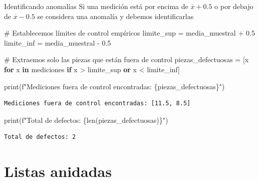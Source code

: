 \documentclass[
  ignorenonframetext,
  aspectratio=169,
  spanish,
]{beamer}
\newenvironment{Shaded}{\begin{snugshade}}{\end{snugshade}}
\newcommand{\BuiltInTok}[1]{\textcolor[rgb]{0.00,0.23,0.31}{#1}}
\newcommand{\CommentTok}[1]{\textcolor[rgb]{0.37,0.37,0.37}{#1}}
\newcommand{\ControlFlowTok}[1]{\textcolor[rgb]{0.00,0.23,0.31}{\textbf{#1}}}
\newcommand{\FloatTok}[1]{\textcolor[rgb]{0.68,0.00,0.00}{#1}}
\newcommand{\KeywordTok}[1]{\textcolor[rgb]{0.00,0.23,0.31}{\textbf{#1}}}
\newcommand{\NormalTok}[1]{\textcolor[rgb]{0.00,0.23,0.31}{#1}}
\newcommand{\OperatorTok}[1]{\textcolor[rgb]{0.37,0.37,0.37}{#1}}
\newcommand{\SpecialCharTok}[1]{\textcolor[rgb]{0.37,0.37,0.37}{#1}}
\newcommand{\SpecialStringTok}[1]{\textcolor[rgb]{0.13,0.47,0.30}{#1}}
\begin{document}
\begin{frame}[fragile]{Identificando anomalías}
\label{identificando-anomaluxedas}
Si una medición está por encima de \(\overline x +0.5\) o por debajo de
\(\overline x - 0.5\) se considera una anomalía y debemos identificarlas

\begin{Shaded}
\begin{Highlighting}[]
\CommentTok{\# Establecemos límites de control empíricos}
\NormalTok{limite\_sup }\OperatorTok{=}\NormalTok{ media\_muestral }\OperatorTok{+} \FloatTok{0.5}
\NormalTok{limite\_inf }\OperatorTok{=}\NormalTok{ media\_muestral }\OperatorTok{{-}} \FloatTok{0.5}

\CommentTok{\# Extraemos solo las piezas que están fuera de control}
\NormalTok{piezas\_defectuosas }\OperatorTok{=}\NormalTok{ [x }\ControlFlowTok{for}\NormalTok{ x }\KeywordTok{in}\NormalTok{ mediciones }\ControlFlowTok{if}\NormalTok{ x }\OperatorTok{\textgreater{}}\NormalTok{ limite\_sup }\KeywordTok{or}\NormalTok{ x }\OperatorTok{\textless{}}\NormalTok{ limite\_inf]}

\BuiltInTok{print}\NormalTok{(}\SpecialStringTok{f"Mediciones fuera de control encontradas: }\SpecialCharTok{\{}\NormalTok{piezas\_defectuosas}\SpecialCharTok{\}}\SpecialStringTok{"}\NormalTok{)}
\end{Highlighting}
\end{Shaded}

\begin{verbatim}
Mediciones fuera de control encontradas: [11.5, 8.5]
\end{verbatim}

\begin{Shaded}
\begin{Highlighting}[]
\BuiltInTok{print}\NormalTok{(}\SpecialStringTok{f"Total de defectos: }\SpecialCharTok{\{}\BuiltInTok{len}\NormalTok{(piezas\_defectuosas)}\SpecialCharTok{\}}\SpecialStringTok{"}\NormalTok{)}
\end{Highlighting}
\end{Shaded}

\begin{verbatim}
Total de defectos: 2
\end{verbatim}
\end{frame}

\section{Listas anidadas}\label{listas-anidadas}
\end{document}
